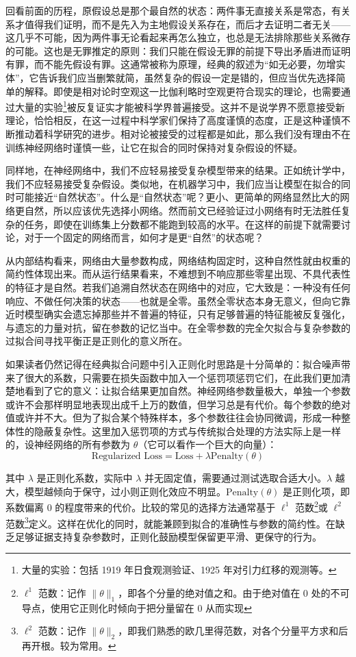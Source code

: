 回看前面的历程，原假设总是那个最自然的状态：两件事无直接关系是常态，有关系才值得我们证明，而不是先入为主地假设关系存在，而后才去证明二者无关——这几乎不可能，因为两件事无论看起来再怎么独立，也总是无法排除那些关系微存的可能。这也是无罪推定的原则：我们只能在假设无罪的前提下导出矛盾进而证明有罪，而不能先假设有罪。这通常被称为原理，经典的叙述为“如无必要，勿增实体”，它告诉我们应当删繁就简，虽然复杂的假设一定是错的，但应当优先选择简单的解释。即使是相对论时空观这一比伽利略时空观更符合现实的理论，也需要通过大量的实验\footnote{大量的实验：包括 1919 年日食观测验证、1925 年对引力红移的观测等。}被反复证实才能被科学界普遍接受。这并不是说学界不愿意接受新理论，恰恰相反，在这一过程中科学家们保持了高度谨慎的态度，正是这种谨慎不断推动着科学研究的进步。相对论被接受的过程都是如此，那么我们没有理由不在训练神经网络时谨慎一些，让它在拟合的同时保持对复杂假设的怀疑。

同样地，在神经网络中，我们不应轻易接受复杂模型带来的结果。正如统计学中，我们不应轻易接受复杂假设。类似地，在机器学习中，我们应当让模型在拟合的同时可能接近“自然状态”。什么是“自然状态”呢？更小、更简单的网络显然比大的网络更自然，所以应该优先选择小网络。然而前文已经验证过小网络有时无法胜任复杂的任务，即使在训练集上分数都不能跑到较高的水平。在这样的前提下就需要讨论，对于一个固定的网络而言，如何才是更“自然”的状态呢？

从内部结构看来，网络由大量参数构成，网络结构固定时，这种自然性就由权重的简约性体现出来。而从运行结果看来，不难想到不响应那些零星出现、不具代表性的特征才是自然。若我们追溯自然状态在网络中的对应，它大致是：一种没有任何响应、不做任何决策的状态——也就是全零。虽然全零状态本身无意义，但向它靠近时模型确实会遗忘掉那些并不普遍的特征，只有足够普遍的特征能被反复强化，与遗忘的力量对抗，留在参数的记忆当中。在全零参数的完全欠拟合与复杂参数的过拟合间寻找平衡正是正则化的意义所在。

如果读者仍然记得在经典拟合问题中引入正则化时思路是十分简单的：拟合噪声带来了很大的系数，只需要在损失函数中加入一个惩罚项惩罚它们，在此我们更加清楚地看到了它的意义：让拟合结果更加自然。神经网络参数量极大，单独一个参数或许不会那样明显地表现出成千上万的数值，但学习总是有代价。每个参数的绝对值或许并不大。但为了拟合某个特殊样本，多个参数往往会协同微调，形成一种整体性的隐蔽复杂性。这里加入惩罚项的方式与传统拟合处理的方法实际上是一样的，设神经网络的所有参数为 $\theta$（它可以看作一个巨大的向量）：
\[
    \text{Regularized Loss} = \text{Loss} + \lambda \text{Penalty}(\theta)
\]

其中 $\lambda$ 是正则化系数，实际中 $\lambda$ 并无固定值，需要通过测试选取合适大小。$\lambda$ 越大，模型越倾向于保守，过小则正则化效应不明显。$\text{Penalty}(\theta)$ 是正则化项，即系数偏离 0 的程度带来的代价。比较的常见的选择方法通常基于 $\ell^1$ 范数\footnote{$\ell^1$ 范数：记作 $\|\theta\|_1$，即各个分量的绝对值之和。由于绝对值在 0 处的不可导点，使用它正则化时倾向于把分量留在 0 从而实现}或 $\ell^2$ 范数\footnote{$\ell^2$ 范数：记作 $\|\theta\|_2$，即我们熟悉的欧几里得范数，对各个分量平方求和后再开根。较为常用。}定义。这样在优化的同时，就能兼顾到拟合的准确性与参数的简约性。在缺乏足够证据支持复杂参数时，正则化鼓励模型保留更平滑、更保守的行为。


